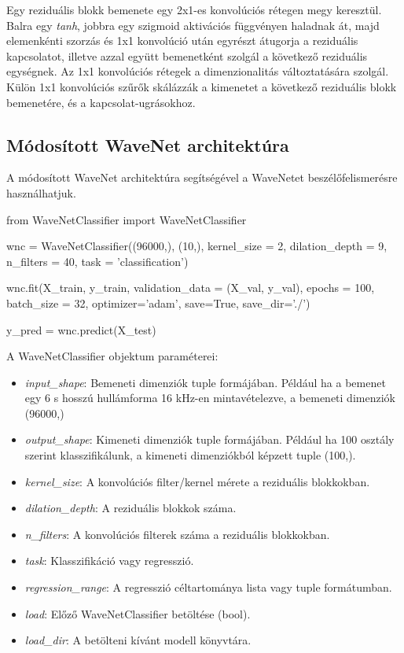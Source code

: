 Egy reziduális blokk bemenete egy 2x1-es konvolúciós rétegen megy keresztül. Balra egy \emph{tanh}, jobbra egy szigmoid aktivációs függvényen haladnak át, majd elemenkénti szorzás és 1x1 konvolúció után egyrészt átugorja a reziduális kapcsolatot, illetve azzal együtt bemenetként szolgál a következő reziduális egységnek. Az 1x1 konvolúciós rétegek a dimenzionalitás változtatására szolgál. Külön 1x1 konvolúciós szűrők skálázzák a kimenetet a következő reziduális blokk bemenetére, és a kapcsolat-ugrásokhoz.

\subsection{Módosított WaveNet architektúra}

A módosított WaveNet architektúra segítségével a WaveNetet beszélőfelismerésre használhatjuk.
\bigskip
\begin{python}
	from WaveNetClassifier import WaveNetClassifier
	
	wnc = WaveNetClassifier((96000,), (10,), kernel_size = 2, dilation_depth = 9,
	                         n_filters = 40, task = 'classification')
	
	wnc.fit(X_train, y_train, validation_data = (X_val, y_val), epochs = 100,
	        batch_size = 32, optimizer='adam', save=True, save_dir='./')
	
	y_pred = wnc.predict(X_test)
	
\end{python}
\bigskip
A WaveNetClassifier objektum paraméterei:

\begin{itemize}
	\item \emph{input\_shape}: Bemeneti dimenziók tuple formájában. Például ha a bemenet egy 6 s hosszú hullámforma 16 kHz-en mintavételezve, a bemeneti dimenziók (96000,)
	\item \emph{output\_shape}: Kimeneti dimenziók tuple formájában. Például ha 100 osztály szerint klasszifikálunk, a kimeneti dimenziókból képzett tuple (100,).
	\item \emph{kernel\_size}: A konvolúciós filter/kernel mérete a reziduális blokkokban.
	\item \emph{dilation\_depth}: A reziduális blokkok száma.
	\item \emph{n\_filters}: A konvolúciós filterek száma a reziduális blokkokban.
	\item \emph{task}: Klasszifikáció vagy regresszió.
	\item \emph{regression\_range}: A regresszió céltartománya lista vagy tuple formátumban.
	\item \emph{load}: Előző WaveNetClassifier betöltése (bool).
	\item \emph{load\_dir}: A betölteni kívánt modell könyvtára.
\end{itemize}

